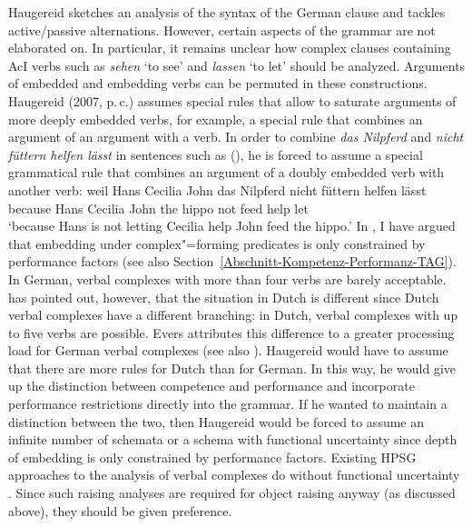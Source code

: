 \begin{exe}
\begin{xlist}[iv.]
\begin{exe}
\begin{xlist}[iv.]
Haugereid sketches an analysis of the syntax of the German clause and tackles active/passive alternations.
However, certain aspects of the grammar are not elaborated on. In particular, it remains unclear how complex clauses containing AcI verbs such as
\emph{sehen} `to see' and \emph{lassen} `to let' should be analyzed. Arguments of embedded and embedding verbs can be permuted in
these constructions. Haugereid (2007, p.\,c.) assumes special rules that allow to saturate arguments of more deeply embedded verbs, for example,
a special rule that combines an  argument of an argument with a verb. In order to combine \emph{das Nilpferd} and \emph{nicht füttern helfen
  lässt} in sentences such as (), he is forced to assume a special grammatical rule that combines an argument of a doubly embedded verb with another verb:
\ea
\label{ex-nilpferd-fuettern-helfen-laesst}
\gll weil    Hans Cecilia John das Nilpferd nicht füttern helfen lässt\\
     because Hans Cecilia John the hippo not feed help let\\
\glt `because Hans is not letting Cecilia help John feed the hippo.'
\z
In \citet[]{Mueller2004b}, I have argued that embedding under complex"=forming predicates is only constrained by performance factors
(see also Section~\ref{Abschnitt-Kompetenz-Performanz-TAG}). In German, verbal complexes with more than four verbs are barely acceptable.
\citet[--59]{Evers75a} has pointed out, however, that the situation in Dutch is different since Dutch verbal complexes have a different branching:
in Dutch, verbal complexes with up to five verbs are possible. Evers attributes this difference to a greater processing load for German verbal complexes
(see also \citealp[Section~3.7]{Gibson98a}). Haugereid would have to assume that there are more rules
for Dutch than for German. In this way, he would give up the distinction between competence and
performance and incorporate performance restrictions directly into the grammar. If he wanted to maintain a distinction between the two, then Haugereid would
be forced to assume an infinite number of schemata or a schema with functional uncertainty since depth of embedding is only
constrained by performance factors. Existing HPSG approaches to the analysis of verbal complexes do
without functional uncertainty \citep{HN94a}.
Since such raising analyses are required for object raising anyway (as discussed above), they should be given preference.


\end{xlist}
\end{exe}
\end{xlist}
\end{exe}
